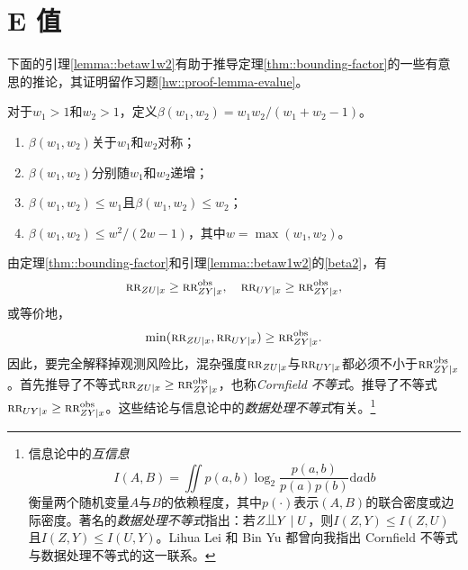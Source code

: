 \section{E 值}

下面的引理\ref{lemma::betaw1w2}有助于推导定理\ref{thm::bounding-factor}的一些有意思的推论，其证明留作习题\ref{hw::proof-lemma-evalue}。 

\begin{lemma}
\label{lemma::betaw1w2}
对于$w_1 > 1$和$w_2 > 1$，定义$\beta(w_1, w_2) = w_1 w_2/(w_1 + w_2 - 1)$。  
\begin{enumerate}
[(1)]
\item
$\beta(w_1, w_2)$关于$w_1$和$w_2$对称；
\item
$\beta(w_1, w_2)$分别随$w_1$和$w_2$递增；
\item\label{beta2}
$\beta(w_1, w_2) \leq w_1$且$\beta(w_1, w_2) \leq w_2$；
\item\label{beta3}
$\beta(w_1, w_2) \leq w^2/(2w-1)$，其中$w = \max(w_1, w_2)$。
\end{enumerate}
\end{lemma}



 


由定理\ref{thm::bounding-factor}和引理\ref{lemma::betaw1w2}的\eqref{beta2}，有
$$
 \textsc{rr}_{ZU\mid x} \geq \textsc{rr}_{ZY\mid x}^{\textup{obs}}, \quad  \textsc{rr}_{UY\mid x}  \geq \textsc{rr}_{ZY\mid x}^{\textup{obs}} , 
$$
或等价地，
$$
\min( \textsc{rr}_{ZU\mid x} ,  \textsc{rr}_{UY\mid x} ) \geq \textsc{rr}_{ZY\mid x}^{\textup{obs}}.
$$
因此，要完全解释掉观测风险比，混杂强度$\textsc{rr}_{ZU\mid x} $与$  \textsc{rr}_{UY\mid x}$都必须不小于$\textsc{rr}_{ZY\mid x}^{\textup{obs}}$。\citet{Cornfield::1959}首先推导了不等式$\textsc{rr}_{ZU\mid x} \geq \textsc{rr}_{ZY\mid x}^{\textup{obs}}$，也称{\it Cornfield 不等式}\citep{gastwirth1998cornfield}。\citet{Schlesselman::1978}推导了不等式$\textsc{rr}_{UY\mid x}  \geq \textsc{rr}_{ZY\mid x}^{\textup{obs}}$。这些结论与信息论中的{\it 数据处理不等式}有关。\footnote{信息论中的{\it 互信息}
$$
I(A,B) = \iint p(a,b) \log_2 \frac{  p(a,b) }{p(a)p(b)} \text{d} a \text{d} b
$$
衡量两个随机变量$A$与$B$的依赖程度，其中$p(\cdot)$表示$(A,B)$的联合密度或边际密度。著名的{\it 数据处理不等式}指出：若$Z\ind Y \mid U$，则$I(Z,Y) \leq I(Z,U)$且$I(Z,Y) \leq I(U,Y)$。Lihua Lei 和 Bin Yu 都曾向我指出 Cornfield 不等式与数据处理不等式的这一联系。} 



